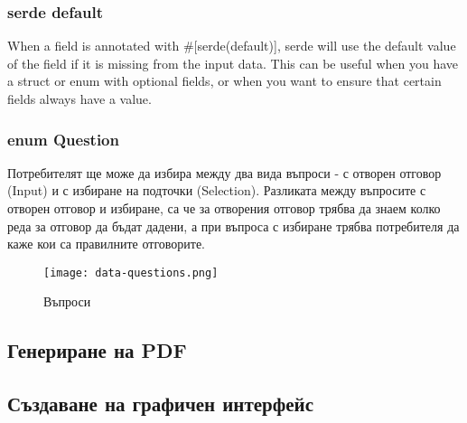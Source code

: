 \subsubsection{serde default}
When a field is annotated with \#[serde(default)], serde will use the default
value of the field if it is missing from the input data. This can be useful
when you have a struct or enum with optional fields, or when you want to ensure
that certain fields always have a value.


\subsubsection{enum Question}
Потребителят ще може да избира между два вида въпроси - с отворен отговор
(Input) и с избиране на подточки (Selection). Разликата между въпросите с
отворен отговор и избиране, са че за отворения отговор трябва да знаем колко
реда за отговор да бъдат дадени, а при въпроса с избиране трябва потребителя да
каже кои са правилните отговорите.

\begin{figure}[!htb]
  \texttt{[image: data-questions.png]}
  \centering
  \caption{Въпроси}
  \label{fig:data-questions}
\end{figure}

\subsection{Генериране на PDF}
\subsection{Създаване на графичен интерфейс}




